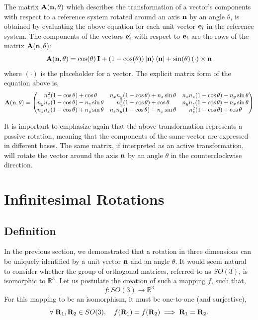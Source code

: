 \documentclass[12pt]{article}
\begin{document}
The matrix $\vb{A}(\vb{n}, \theta)$ which describes the transformation of a vector's
components with respect to a reference system rotated around an axis $\vb{n}$ by an angle
$\theta$, is obtained by evaluating the above equation for each unit vector $\vb{e}_i$ in
the reference system. The components of the vectors $\vb{e}'_i$ with respect to $\vb{e}_i$
are the rows of the matrix $\vb{A}(\vb{n}, \theta)$:
\begin{equation}
  \vb{A}(\vb{n},\theta) = \cos(\theta)\,\vb{I} + (1-\cos(\theta))\ket{\vb{n}}\bra{\vb{n}}
    + \sin(\theta)\,(\cdot) \times \vb{n}
  \label{kinematics:rodrigues-formula}
\end{equation}
where $(\cdot)$ is the placeholder for a vector. The explicit matrix form of the equation
above is,
\begin{equation}
  \vb{A}(\vb{n},\theta) =
  \begin{pmatrix}
    n_x^2(1-\cos\theta)+\cos\theta        & n_x n_y(1-\cos\theta)+n_z\sin\theta   & n_x n_z(1-\cos\theta)-n_y\sin\theta \\
    n_y n_x(1-\cos\theta)-n_z\sin\theta   & n_y^2(1-\cos\theta)+\cos\theta        & n_y n_z(1-\cos\theta)+n_x\sin\theta \\
    n_z n_x(1-\cos\theta)+n_y\sin\theta   & n_z n_y(1-\cos\theta)-n_x\sin\theta   & n_z^2(1-\cos\theta)+\cos\theta
  \end{pmatrix}
\end{equation}

It is important to emphasize again that the above transformation represents a passive
rotation, meaning that the components of the same vector are expressed in different bases.
The same matrix, if interpreted as an active transformation, will rotate the vector around
the axis $\vb{n}$ by an angle $\theta$ in the counterclockwise direction.

\section{Infinitesimal Rotations}

\subsection{Definition}

In the previous section, we demonstrated that a rotation in three dimensions can be uniquely
identified by a unit vector $\vb{n}$ and an angle $\theta$. It would seem natural to consider
whether the group of orthogonal matrices, referred to as $SO(3)$, is isomorphic to
$\mathbb{R}^3$. Let us postulate the creation of such a mapping $f$, such that,
\begin{equation}
  f: SO(3) \to \mathbb{R}^3
\end{equation}
For this mapping to be an isomorphism, it must be one-to-one (and surjective),
\begin{equation}
  \forall\; \vb{R}_1, \vb{R}_2 \in SO(3),\quad
  f(\vb{R}_1) = f(\vb{R}_2) \implies \vb{R}_1 = \vb{R}_2.
\end{equation}
\end{document}
